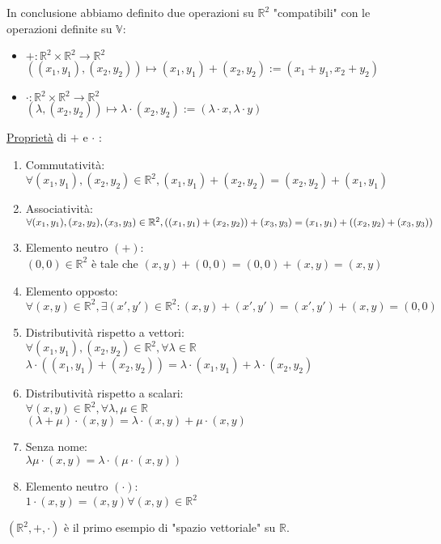 \documentclass{article}
\newcommand{\ul}[1]{\underline{#1}}
\newcommand{\R}{\mathbb{R}}
\newcommand{\V}{\mathbb{V}}
\begin{document}
In conclusione abbiamo definito due operazioni su $\R^2$ "compatibili" con le operazioni definite su $\V$:
\begin{itemize}
	\item $+: \R^2\times\R^2\rightarrow\R^2$\\$((x_1,y_1),(x_2,y_2))\mapsto(x_1,y_1)+(x_2,y_2):=(x_1+y_1,x_2+y_2)$
	\item $\cdot: \R^2\times\R^2\rightarrow\R^2$\\\hspace*{-0.3em}$(\lambda,(x_2,y_2))\mapsto\lambda\cdot(x_2,y_2):=(\lambda\cdot x,\lambda\cdot y)$
\end{itemize}
\ul{Proprietà} di $+$ e $\cdot$ :
\begin{enumerate}
	\item Commutatività:\\$\forall(x_1,y_1),(x_2,y_2)\in\R^2, (x_1,y_1)+(x_2,y_2)=(x_2,y_2)+(x_1,y_1)$
	\item Associatività:\\$\forall(x_1,y_1),(x_2,y_2),(x_3,y_3)\in\R^2,\\((x_1,y_1)+(x_2,y_2))+(x_3,y_3)=(x_1,y_1)+((x_2,y_2)+(x_3,y_3))$
	\item Elemento neutro $(+)$:\\$(0,0)\in\R^2$ è tale che $(x,y)+(0,0)=(0,0)+(x,y)=(x,y)$
	\item Elemento opposto:\\$\forall(x,y)\in\R^2,\exists(x',y')\in\R^2:(x,y)+(x',y')=(x',y')+(x,y)=(0,0)$
	\item Distributività rispetto a vettori:\\$\forall(x_1,y_1),(x_2,y_2)\in\R^2,\forall\lambda\in\R$\\$\lambda\cdot((x_1,y_1)+(x_2,y_2))=\lambda\cdot(x_1,y_1)+\lambda\cdot(x_2,y_2)$
	\item Distributività rispetto a scalari:\\$\forall(x,y)\in\R^2,\forall\lambda,\mu\in\R$\\$(\lambda+\mu)\cdot(x,y)=\lambda\cdot(x,y)+\mu\cdot(x,y)$
	\item Senza nome:\\$\lambda\mu\cdot(x,y)=\lambda\cdot(\mu\cdot(x,y))$
	\item Elemento neutro $(\cdot)$:\\$1\cdot(x,y)=(x,y)\forall(x,y)\in\R^2$
\end{enumerate}
$(\R^2,+,\cdot)$ è il primo esempio di "spazio vettoriale" su $\R$.\vspace*{1em}\\
\end{document}
